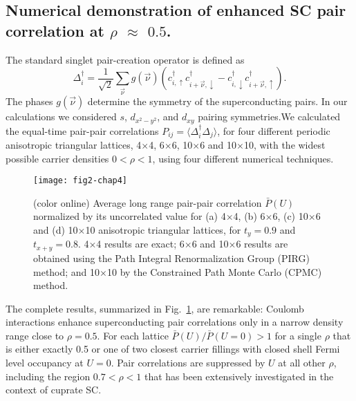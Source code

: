 \documentclass[a4paper,11pt]{article}
\begin{document}
\subsection{Numerical demonstration of enhanced SC pair correlation at $\rho$ $\approx$ $0.5$.}
The standard singlet pair-creation operator is defined as 
\begin{equation}
\Delta^\dagger_i= \frac{1}{\sqrt{2}}\sum_{\vec{\nu}} g(\vec{\nu}) 
(c^\dagger_{i,\uparrow}c^\dagger_{i+{\vec{\nu}},\downarrow}
- c^\dagger_{i,\downarrow}c^\dagger_{i+{\vec{\nu}},\uparrow}).
\label{pair}
\end{equation}
The phases $g(\vec{\nu})$ determine the symmetry of the superconducting pairs. In our calculations we considered $s$, $d_{x^2-y^2}$, and
$d_{xy}$ pairing symmetries.We calculated \cite{ngomes16} the equal-time pair-pair correlations  $P_{ij}=\langle \Delta^\dagger_i
\Delta_j\rangle$, for four different periodic anisotropic triangular lattices, 4$\times$4, 6$\times$6, 10$\times$6 and 10$\times$10, with
the widest possible carrier densities $0 < \rho <1$, using four different numerical techniques. 
\begin{figure}[h]
\centerline{\texttt{[image: fig2-chap4]}}
  \caption{(color online) Average long range pair-pair correlation
    $\bar{P}(U)$ normalized by its uncorrelated value for (a)
    4$\times$4, (b) 6$\times$6, (c) 10$\times$6 and (d) 10$\times$10
    anisotropic triangular lattices, for $t_y=0.9$ and $t_{x+y}=0.8$.
    4$\times$4 results are exact; 6$\times$6 and 10$\times$6 results
    are obtained using the Path Integral Renormalization Group (PIRG)
    method; and 10$\times$10 by the Constrained Path Monte Carlo
    (CPMC) method.}
\label{pairing-fig}
\end{figure}
The complete results, summarized in Fig.~\ref{pairing-fig}, are remarkable:
Coulomb interactions enhance superconducting pair correlations only in a narrow density range close to $\rho=0.5$. For each lattice
$\bar{P}(U)/\bar{P}(U=0)>1$ for a single $\rho$ that is either exactly 0.5 or one of two closest carrier fillings with closed shell Fermi
level occupancy at $U=0$.  Pair correlations are suppressed by $U$ at all other $\rho$, including the region $0.7<\rho<1$ that has been
extensively investigated in the context of cuprate SC.  

\end{document}
